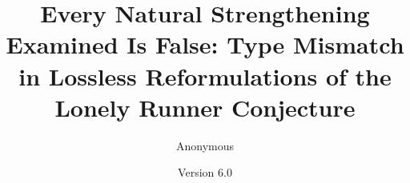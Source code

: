 \documentclass[11pt,a4paper]{article}
\numberwithin{equation}{section}
\theoremstyle{plain}
\theoremstyle{definition}
\theoremstyle{remark}
\newcommand{\papertitle}{Every Natural Strengthening Examined Is False: Type Mismatch
in Lossless Reformulations of the Lonely Runner Conjecture}
\begin{document}
\title{\papertitle}
\author{Anonymous}
\date{Version 6.0}
\maketitle

\tableofcontents
\clearpage












\end{document}
